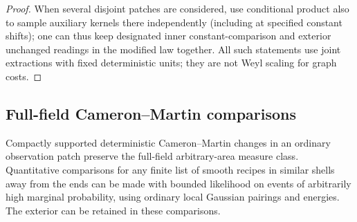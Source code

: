 \begin{proof}
When several disjoint patches are considered, use conditional product also to sample auxiliary
kernels there independently (including at specified constant shifts); one can thus keep designated
inner constant-comparison and exterior unchanged readings in the modified law together. All such
statements use joint extractions with fixed deterministic units; they are not Weyl scaling for graph
costs.

\end{proof}

\subsection{Full-field Cameron--Martin comparisons}

\begin{proposition}\label{conf:cm-comparison}
Compactly supported deterministic Cameron--Martin changes in an ordinary observation patch preserve
the full-field arbitrary-area measure class. Quantitative comparisons for any finite list of smooth
recipes in similar shells away from the ends can be made with bounded likelihood on events of
arbitrarily high marginal probability, using ordinary local Gaussian pairings and energies. The
exterior can be retained in these comparisons.
\end{proposition}
